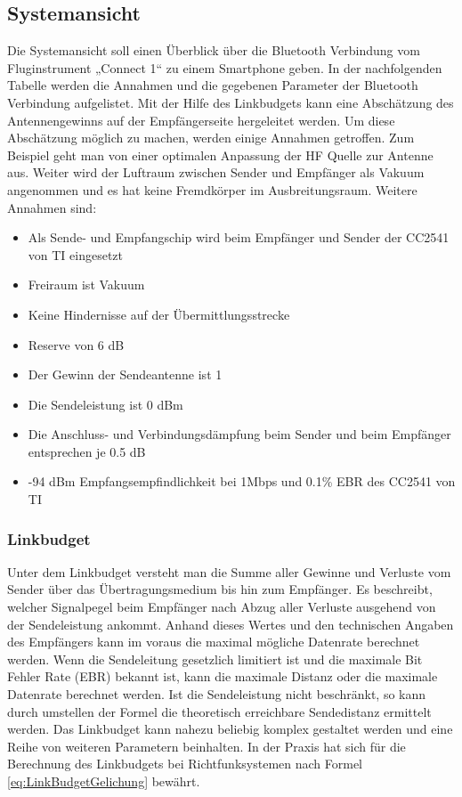 \subsection{Systemansicht}
Die Systemansicht soll einen Überblick über die Bluetooth Verbindung vom Fluginstrument „Connect 1“ zu einem Smartphone geben.
In der nachfolgenden Tabelle werden die Annahmen und  die gegebenen Parameter der Bluetooth Verbindung aufgelistet. Mit der Hilfe des Linkbudgets kann eine Abschätzung des Antennengewinns auf der Empfängerseite hergeleitet werden. Um diese Abschätzung möglich zu machen, werden einige Annahmen getroffen. Zum Beispiel geht man von einer optimalen Anpassung der HF Quelle zur Antenne aus. Weiter wird der Luftraum zwischen Sender und Empfänger als Vakuum angenommen und es hat keine Fremdkörper im Ausbreitungsraum.
Weitere Annahmen sind:
\begin{itemize}
\item Als Sende- und Empfangschip wird beim Empfänger und Sender der CC2541 von TI eingesetzt
\item Freiraum ist Vakuum
\item Keine Hindernisse auf der Übermittlungsstrecke
\item Reserve von 6 dB

\item Der Gewinn der Sendeantenne ist 1
\item Die Sendeleistung ist 0 dBm
\item Die Anschluss- und Verbindungsdämpfung beim Sender und beim Empfänger entsprechen je 0.5 dB
\item -94 dBm Empfangsempfindlichkeit bei 1Mbps und 0.1\% EBR des CC2541 von TI
\end{itemize}

\subsubsection{Linkbudget}
Unter dem Linkbudget versteht man die Summe aller Gewinne und Verluste vom Sender über das Übertragungsmedium bis hin zum Empfänger. Es beschreibt, welcher Signalpegel beim Empfänger nach Abzug aller Verluste ausgehend von der Sendeleistung ankommt. Anhand dieses Wertes und den technischen Angaben des Empfängers kann im voraus die maximal mögliche Datenrate berechnet werden. Wenn die Sendeleitung gesetzlich limitiert ist und die maximale Bit Fehler Rate (EBR) bekannt ist, kann die maximale Distanz oder die maximale Datenrate berechnet werden. Ist die Sendeleistung nicht beschränkt, so kann durch umstellen der Formel die theoretisch erreichbare Sendedistanz ermittelt werden. 
Das Linkbudget kann  nahezu beliebig komplex gestaltet werden und eine  Reihe von weiteren Parametern beinhalten. In der Praxis hat sich für die Berechnung des Linkbudgets bei Richtfunksystemen nach  Formel \ref{eq:LinkBudgetGelichung} bewährt.


